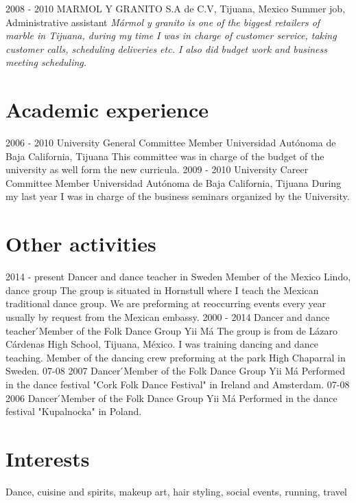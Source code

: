 \documentclass[]{friggeri-cv}
\begin{document}
\begin{entrylist}
  \entry
    {2008 - 2010}
    {MARMOL Y GRANITO S.A de C.V, Tijuana, Mexico}
    {Summer job, Administrative assistant}
    {\emph{Mármol y granito is one of the biggest retailers of
    marble in Tijuana, during my time I was in charge of
    customer service, taking customer calls, scheduling
    deliveries etc. I also did budget work and business
    meeting scheduling.}}
\end{entrylist}

\section{Academic experience}
\begin{entrylist}
  \entry
    {2006 - 2010}
    {University General Committee Member}
    {Universidad Autónoma de Baja California, Tijuana}
    {This committee was in charge of the budget of the
    university as well form the new curricula.}
  \entry
    {2009 - 2010}
    {University Career Committee Member}
    {Universidad Autónoma de Baja California, Tijuana}
    {During my last year I was in charge of the business seminars
    organized by the University.}
\end{entrylist}

\section{Other activities}

\begin{entrylist}
  \entry
    {2014 - present}
    {Dancer and dance teacher in Sweden}
    {Member of the Mexico Lindo, dance group}
    {The group is situated in Hornstull where I teach the Mexican traditional dance group. We are preforming at
    reoccurring events every year usually by request from the Mexican embassy.}
  \entry
    {2000 - 2014}
    {Dancer and dance teacher}
    {́Member of the Folk Dance Group Yii Má}
    {The group is from de Lázaro Cárdenas High School, Tijuana,
    México. I was training dancing and dance teaching. Member of the
    dancing crew preforming at the park High Chaparral in Sweden.}
  \entry
    {07-08 2007}
    {Dancer}
    {́Member of the Folk Dance Group Yii Má}
    {Performed in the dance festival "Cork Folk
    Dance Festival" in Ireland and Amsterdam.}
  \entry
    {07-08 2006}
    {Dancer}
    {́Member of the Folk Dance Group Yii Má}
    {Performed in the dance festival "Kupalnocka" in Poland.}
\end{entrylist}

\section{Interests}
    Dance, cuisine and spirits, makeup art, hair styling, social events, running, travel
\end{document}
